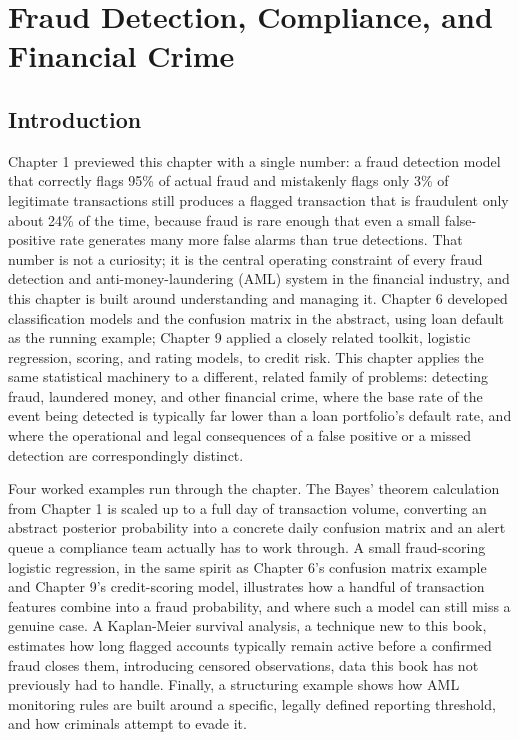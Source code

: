 \documentclass[../ai_in_finance]{subfiles}
\begin{document}
\chapter{Fraud Detection, Compliance, and Financial Crime}

\section{Introduction}

Chapter 1 previewed this chapter with a single number: a fraud detection model that correctly flags 95\% of actual fraud and mistakenly flags only 3\% of legitimate transactions still produces a flagged transaction that is fraudulent only about 24\% of the time, because fraud is rare enough that even a small false-positive rate generates many more false alarms than true detections. That number is not a curiosity; it is the central operating constraint of every fraud detection and anti-money-laundering (AML) system in the financial industry, and this chapter is built around understanding and managing it. Chapter 6 developed classification models and the confusion matrix in the abstract, using loan default as the running example; Chapter 9 applied a closely related toolkit, logistic regression, scoring, and rating models, to credit risk. This chapter applies the same statistical machinery to a different, related family of problems: detecting fraud, laundered money, and other financial crime, where the base rate of the event being detected is typically far lower than a loan portfolio's default rate, and where the operational and legal consequences of a false positive or a missed detection are correspondingly distinct.

Four worked examples run through the chapter. The Bayes' theorem calculation from Chapter 1 is scaled up to a full day of transaction volume, converting an abstract posterior probability into a concrete daily confusion matrix and an alert queue a compliance team actually has to work through. A small fraud-scoring logistic regression, in the same spirit as Chapter 6's confusion matrix example and Chapter 9's credit-scoring model, illustrates how a handful of transaction features combine into a fraud probability, and where such a model can still miss a genuine case. A Kaplan-Meier survival analysis, a technique new to this book, estimates how long flagged accounts typically remain active before a confirmed fraud closes them, introducing censored observations, data this book has not previously had to handle. Finally, a structuring example shows how AML monitoring rules are built around a specific, legally defined reporting threshold, and how criminals attempt to evade it.
\end{document}
